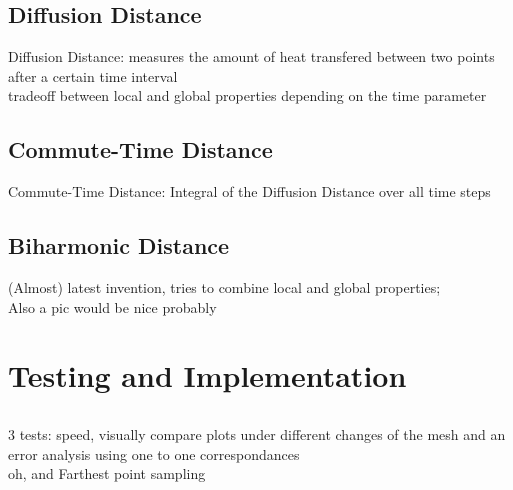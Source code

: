 \documentclass[]{beamer}
\begin{document}
\subsection{Diffusion Distance}
	\begin{frame}
		Diffusion Distance: measures the amount of heat transfered between two points after a certain time interval \\
		tradeoff between local and global properties depending on the time parameter

	\end{frame}

\subsection{Commute-Time Distance}
	\begin{frame}
		Commute-Time Distance: Integral of the Diffusion Distance over all time steps
	\end{frame}

\subsection{Biharmonic Distance}
	\begin{frame}
		(Almost) latest invention, tries to combine local and global properties;\\
		Also a pic would be nice probably
	\end{frame}

\section{Testing and Implementation}
\subsection*{}
	\begin{frame}
		3 tests: speed, visually compare plots under different changes of the mesh
		and an error analysis using one to one correspondances\\
		oh, and Farthest point sampling
	\end{frame}
\end{document}
